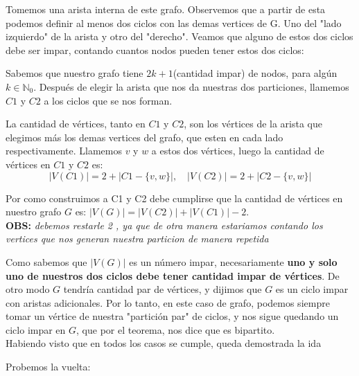 \documentclass{article}
\begin{document}
\begin{itemize}
\begin{center}
\end{center}
Tomemos una arista interna de este grafo. Observemos que a partir de esta  podemos definir al menos dos ciclos con las demas vertices de G. Uno del "lado izquierdo" de la arista y otro del "derecho". Veamos que alguno de estos dos ciclos debe ser impar, contando cuantos nodos pueden tener estos dos ciclos:

Sabemos que nuestro grafo tiene $2k + 1$(cantidad impar) de nodos, para algún $k \in \mathbb{N}_0$. Después de elegir la arista que nos da nuestras dos particiones, llamemos $C1$ y $C2$ a los ciclos que se nos forman.

La cantidad de vértices, tanto en $C1$ y $C2$, son los vértices de la arista que elegimos más los demas vertices del grafo, que esten en cada lado respectivamente. Llamemos $v$ y $w$ a estos dos vértices, luego la cantidad de vértices en $C1$ y $C2$ es:
\[|V(C1)| = 2 + |C1 - \{v,w\}|, \quad |V(C2)| = 2 + |C2 - \{v,w\}|\]

Por como construimos a C1 y C2 debe cumplirse que la cantidad de vértices en nuestro grafo $G$ es:  $ |V(G)| = |V(C2)| + |V(C1)| - 2$.\\
\textbf{OBS:}\textit{ debemos restarle 2 , ya que de otra manera estariamos contando los vertices que nos generan nuestra particion de manera repetida}

Como sabemos que $|V(G)|$ es un número impar, necesariamente \textbf{uno y solo uno de nuestros dos ciclos debe tener cantidad impar de vértices}. De otro modo $G$ tendría cantidad par de vértices, y dijimos que $G$ es un ciclo impar con aristas adicionales. Por lo tanto, en este caso de grafo, podemos siempre tomar un vértice de nuestra "partición par" de ciclos, y nos sigue quedando un ciclo impar en $G$, que por el teorema, nos dice que es bipartito.\\

Habiendo visto que en todos los casos se cumple, queda demostrada la ida

\end{itemize}
Probemos la vuelta: \\
\end{document}
